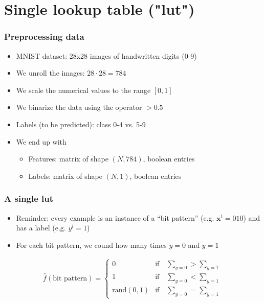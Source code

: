 \documentclass[pdflatex,compress]{beamer}
\begin{document}

\section{Single lookup table ("lut")}

\begin{frame}
	\frametitle{Preprocessing data}
	\begin{itemize}
		\item MNIST dataset: 28x28 images of handwritten digits (0-9)
		\item We unroll the images: $28 \cdot 28 = 784$
		\item We scale the numerical values to the range $[0,1]$
		\item We binarize the data using the operator $>0.5$
		\item Labels (to be predicted): class 0-4 vs. 5-9
	\end{itemize}
	\vspace{1em}
	\begin{itemize}
		\item We end up with
			\begin{itemize}
				\item Features: matrix of shape $(N, 784)$, boolean entries
				\item Labels: matrix of shape $(N, 1)$, boolean entries
			\end{itemize}
	\end{itemize}
\end{frame}

\begin{frame}
	\frametitle{A single lut}
	\begin{itemize}
		\item Reminder: every example is an instance of a \enquote{bit pattern} (e.g. $\bm{x}^i=010$) and has a label (e.g. $y^i=1$)
		\item For each bit pattern, we cound how many times $y=0$ and $y=1$
	\end{itemize}
	\begin{align*}
		\hat{f}(\text{bit pattern}) =
		\begin{cases}
			0 & \text{if} \hspace{1em} \sum\limits_{y=0} > \sum\limits_{y=1} \\
			1 & \text{if} \hspace{1em} \sum\limits_{y=0} < \sum\limits_{y=1} \\
			\text{rand}(0,1) & \text{if} \hspace{1em} \sum\limits_{y=0} = \sum\limits_{y=1}
		\end{cases}
	\end{align*}
\end{frame}
\end{document}
